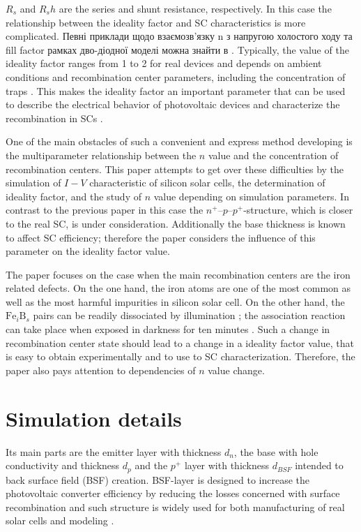 $R_s$ and $R_sh$ are the series and shunt resistance, respectively.
In this case the relationship between the ideality factor and SC characteristics is more complicated.
Певні приклади щодо взаємозв'язку n з напругою холостого ходу та fill factor  рамках дво-діодної моделі можна знайти в \cite{Olikh2018SM}.
Typically, the value of the ideality factor ranges from 1 to 2 for real devices and depends on ambient conditions and recombination center parameters,
including the concentration of traps \cite{n2_Beier,n2McIntosh,n2Kaminski,HAMEIRI2013251,Heide}.
This makes the ideality factor an important parameter that can be used to describe the electrical behavior of photovoltaic devices and characterize the recombination in SCs \cite{Duan}.

One of the main obstacles of such a convenient and express method developing is the multiparameter relationship between
the $n$ value and the concentration of recombination centers.
This paper attempts to get over these difficulties by the simulation of $I-V$ characteristic of silicon solar cells,
the determination of ideality factor, and the study of  $n$ value depending on simulation parameters.
In contrast to the previous paper \cite{Olikh2019SM} in this case the $n^+$--$p$--$p^+$-structure,
which is closer to the real SC, is under consideration.
Additionally the base thickness is known \cite{Sach_d,FeB:Schmidt} to affect SC efficiency;
therefore the paper considers the influence of this parameter on the ideality factor value.

The paper focuses on the case when the main recombination centers are the iron related defects.
On the one hand, the iron atoms  are one of the most common as well as the most harmful impurities in silicon solar cell.
On the other hand, the $\mathrm{Fe}_i\mathrm{B}_s$ pairs can be readily dissociated by illumination \cite{FeB:Schmidt};
the association reaction can take place when exposed in darkness for ten minutes \cite{FeB:kinetic}.
Such a change in recombination center state should lead to a change in a ideality factor value,
that is easy to obtain experimentally and to use to SC characterization.
Therefore, the paper also pays attention to dependencies of $n$ value change.

\section{Simulation details}


Its main parts are the emitter layer with thickness $d_n$, the base with hole conductivity and thickness $d_p$
and the $p^+$ layer with thickness $d_{BSF}$ intended to back surface field (BSF) creation.
BSF-layer is designed to increase the photovoltaic converter efficiency by reducing the losses concerned with surface recombination
and such structure is widely used for both manufacturing of real solar cells and modeling \cite{SCAPSuseSi4,SCAPSuseSi1,SCAPSuseSi5}.

